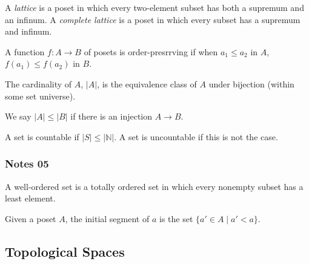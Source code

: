 \documentclass[12pt,letterpaper,reqno]{article}
\begin{document}
\begin{definition}\label{def:lattice}
    A \textit{lattice} is a poset in which every two-element subset has both a supremum and an infinum. A \textit{complete lattice} is a poset in which every subset has a supremum and infinum.
\end{definition}

\begin{definition}\label{def:order-preserving-map}
    A function $f: A \to B$ of posets is order-presrrving if when $a_1 \le a_2$ in $A$, $f(a_1) \le f(a_2)$ in $B$.
\end{definition}

\begin{definition}[Cardinality]\label{def:cardinality}
    The cardinality of $A$, $|A|$, is the equivalence class of $A$ under bijection (within some set universe).
\end{definition}

\begin{definition}\label{def:comparison-of-cardinality}
    We say $|A| \le |B|$ if there is an injection $A \to B$.
\end{definition}

\begin{definition}[Countable]\label{def:countable}
    A set is countable if $|S| \le |\mathbb{N}|$. A set is uncountable if this is not the case.
\end{definition}

\subsubsection{Notes 05}

\begin{definition}\label{def:well-ordered-set}
    A well-ordered set is a totally ordered set in which every nonempty subset has a least element.
\end{definition}

\begin{definition}\label{def:initial-segment}
    Given a poset $A$, the initial segment of $a$ is the set $\{ a' \in A \mid a' < a \}$.
\end{definition}

\newpage
\subsection{Topological Spaces}
\end{document}
